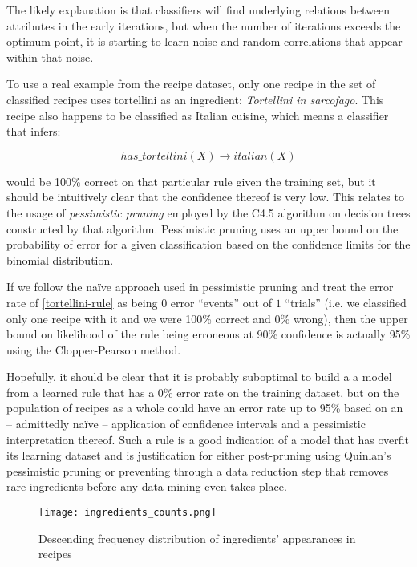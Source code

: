 \documentclass[11pt,a4paper]{article}
\begin{document}
The likely explanation\cite{tetko1995neural} is that classifiers will find underlying
relations between attributes in the early iterations, but when the number of iterations
exceeds the optimum point, it is starting to learn noise and random correlations that
appear within that noise.

To use a real example from the recipe dataset, only one recipe in the set of
classified recipes uses tortellini as an ingredient: \emph{Tortellini in sarcofago}.
This recipe also happens to be classified as Italian cuisine, which means a classifier
that infers:

\begin{equation} \label{tortellini-rule}
has\_tortellini(X) \to italian(X)
\end{equation}

\noindent would be 100\% correct on that particular
rule given the training set, but it should be intuitively clear that the confidence
thereof is very low. This relates to the usage of \emph{pessimistic pruning} employed
by the C4.5 algorithm\cite{quinlan1993c4} on decision trees constructed by that algorithm.
Pessimistic pruning uses an upper bound on the probability of error for a given classification
based on the confidence limits for the binomial distribution.

If we follow the na\"ive approach used in pessimistic pruning and treat the error rate
of \eqref{tortellini-rule} as being $0$ error ``events'' out of $1$ ``trials'' (i.e.
we classified only one recipe with it and we were 100\% correct and 0\% wrong), then
the upper bound on likelihood of the rule being erroneous at 90\% confidence is
actually 95\% using the Clopper-Pearson method.\cite{clopper1934use}

Hopefully, it should be clear that it is probably suboptimal to build a a model from
a learned rule that has a 0\% error rate on the training dataset, but
on the population of recipes as a whole could
have an error rate up to 95\% based on an -- admittedly na\"ive -- application of
confidence intervals and a pessimistic interpretation thereof.
Such a rule is a good indication of a model that has overfit
its learning dataset and is justification for either post-pruning using Quinlan's
pessimistic pruning or preventing through a data reduction step that removes rare
ingredients before any data mining even takes place.

\begin{figure}[p]
  \texttt{[image: ingredients\_counts.png]}
  \caption{Descending frequency distribution of ingredients' appearances in recipes\label{ingredients-counts}}
\end{figure}
\end{document}
